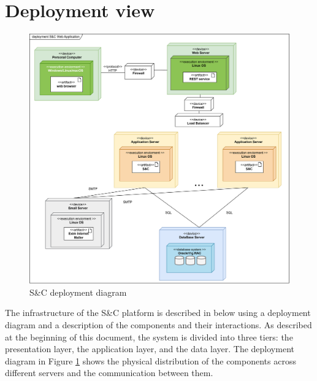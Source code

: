 \section{Deployment view}\label{sec:deployment view}
\begin{figure}[H]
    \centering
    \includegraphics[width=1\textwidth]{Images/Deployment_View.png}
    \caption{S\&C deployment diagram}\label{fig:deployment_diagram}
\end{figure}
The infrastructure of the S\&C platform is described in below using a deployment diagram and a description of the components and their interactions.
As described at the beginning of this document, the system is divided into three tiers: the presentation layer, the application layer, and the data layer.
The deployment diagram in Figure \ref{fig:deployment_diagram} shows the physical distribution of the components across different servers and the communication
between them.

